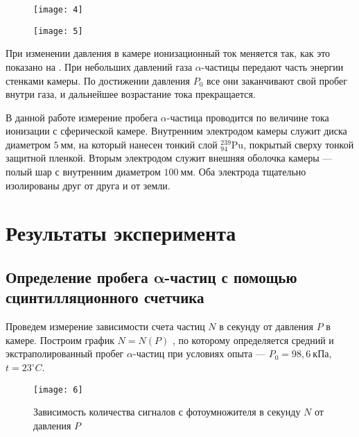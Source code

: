 \documentclass[a4paper, 12pt]{article}
\begin{document}
\begin{figure}[H]
    \begin{floatrow}

        {
        \texttt{[image: 4]}
        \label{fig:4}
    }

        {
        \texttt{[image: 5]}
        \label{fig:5}
    }
    \end{floatrow}
\end{figure}

При изменении давления в камере ионизационный ток меняется так, как
это показано на . При небольших давлений газа
$\alpha$-частицы передают часть энергии стенками камеры. По достижении
давления $P_0$ все они заканчивают свой пробег внутри газа, и
дальнейшее возрастание тока прекращается. 

В данной работе измерение пробега $\alpha$-частица проводится по
величине тока ионизации с сферической камере. Внутренним электродом
камеры служит диска диаметром $5\: \text{мм}$, на который нанесен
тонкий слой $ ^{239}_{94}\text{Pu}$, покрытый сверху тонкой защитной пленкой.
Вторым электродом служит внешняя оболочка камеры --- полый шар с
внутренним диаметром $100\: \text{мм}$. Оба электрода тщательно
изолированы друг от друга и от земли. 





\section{Результаты эксперимента}
\subsection*{Определение пробега $\symbf{\alpha}$-частиц с помощью
сцинтилляционного счетчика}
Проведем измерение зависимости счета частиц $N$ в секунду от давления $P$ в
камере. Построим график $N = N(P)$ , по которому
определяется средний и
экстраполированный пробег $\alpha$-частиц при условиях опыта --- $P_0
= 98,6\: \text{кПа}$, $t = 23^\circ C$.

\begin{figure}[H]
    \texttt{[image: 6]} 
    \caption{Зависимость количества сигналов с фотоумножителя в
    секунду $N$ от давления $P$}
    \label{fig:6}
\end{figure}
\end{document}
